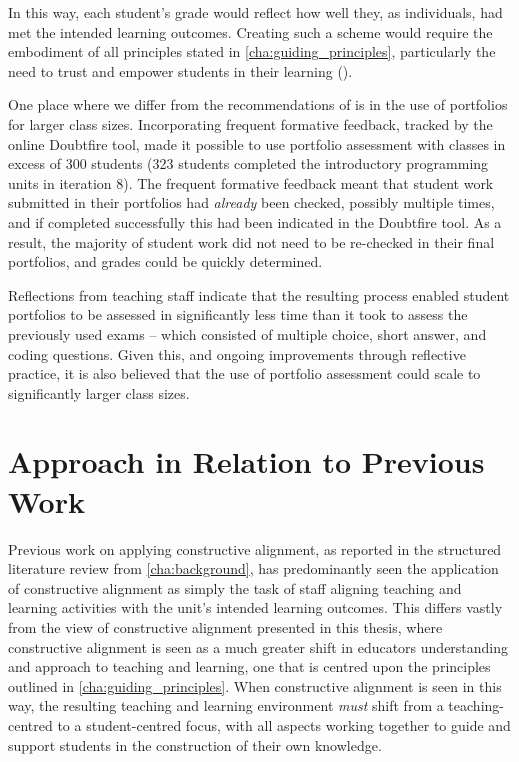 In this way, each student's grade would reflect how well they, as individuals, had met the intended learning outcomes. Creating such a scheme would require the embodiment of all principles stated in \cref{cha:guiding_principles}, particularly the need to trust and empower students in their learning ().

One place where we differ from the recommendations of \citet{Biggs:2007} is in the use of portfolios for larger class sizes. Incorporating frequent formative feedback, tracked by the online Doubtfire tool, made it possible to use portfolio assessment with classes in excess of 300 students (323 students completed the introductory programming units in iteration 8). The frequent formative feedback meant that student work submitted in their portfolios had \emph{already} been checked, possibly multiple times, and if completed successfully this had been indicated in the Doubtfire tool. As a result, the majority of student work did not need to be re-checked in their final portfolios, and grades could be quickly determined. 

Reflections from teaching staff indicate that the resulting process enabled student portfolios to be assessed in significantly less time than it took to assess the previously used exams -- which consisted of multiple choice, short answer, and coding questions. Given this, and ongoing improvements through reflective practice, it is also believed that the use of portfolio assessment could scale to significantly larger class sizes.



\clearpage
\section{Approach in Relation to Previous Work} %
\label{sec:approach_in_relation_to_previous_work}

Previous work on applying constructive alignment, as reported in the structured literature review from \cref{cha:background}, has predominantly seen the application of constructive alignment as simply the task of staff aligning teaching and learning activities with the unit's intended learning outcomes. This differs vastly from the view of constructive alignment presented in this thesis, where constructive alignment is seen as a much greater shift in educators understanding and approach to teaching and learning, one that is centred upon the principles outlined in \cref{cha:guiding_principles}. When constructive alignment is seen in this way, the resulting teaching and learning environment \emph{must} shift from a teaching-centred to a student-centred focus, with all aspects working together to guide and support students in the construction of their own knowledge.

